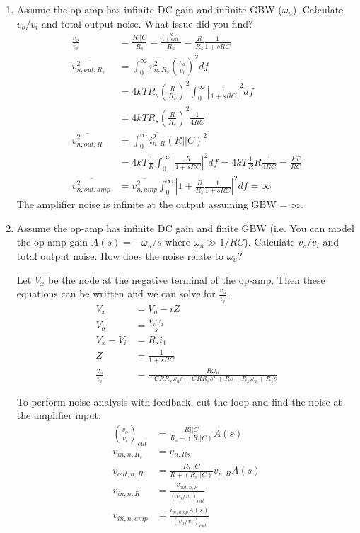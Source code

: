 \begin{enumerate}[label=(\alph*)]
  \item {\color{blue}Assume the op-amp has infinite DC gain and infinite GBW ($\omega_u$). Calculate $v_o / v_i$ and total output noise. What issue did you find?}
    \begin{align*}
      \frac{v_o}{v_i} &= \frac{R || C}{R_s} = \frac{\frac{R}{1 + sRC}}{R_s} = \frac{R}{R_s} \frac{1}{1 + sRC} \\
      \overline{v_{n,out,R_s}^2} &= \int_{0}^{\infty} \overline{v_{n,R_s}^2} \left(\frac{v_o}{v_i}\right)^2 df \\
        &= 4kT R_s \left(\frac{R}{R_s}\right)^2 \int_0^{\infty} \left|\frac{1}{1 + sRC}\right|^2 df \\
        &= 4kT R_s \left(\frac{R}{R_s}\right)^2 \frac{1}{4RC} \\
      \overline{v_{n,out,R}^2} &= \int_{0}^{\infty} \overline{i_{n,R}^2} (R || C)^2 \\
        &= 4kT \frac{1}{R} \int_{0}^{\infty} \left|\frac{R}{1 + sRC}\right|^2 df = 4kT \frac{1}{R} R \frac{1}{4RC} = \frac{kT}{RC} \\
      \overline{v_{n,out,amp}^2} &= \overline{v_{n,amp}^2} \int_0^{\infty} \left|1 + \frac{R}{R_s} \frac{1}{1 + sRC}\right|^2 df = \infty
    \end{align*}
    The amplifier noise is infinite at the output assuming GBW = $\infty$.

  \item {\color{blue}Assume the op-amp has infinite DC gain and finite GBW (i.e. You can model the op-amp gain $A(s) = -\omega_u/s$ where $\omega_u \gg 1 / RC$). Calculate $v_o/v_i$ and total output noise. How does the noise relate to $\omega_u$?}

    Let $V_{x}$ be the node at the negative terminal of the op-amp. Then these equations can be written and we can solve for $\frac{v_o}{v_i}$.
    \begin{align*}
      V_x &= V_o - i Z \\
      V_o &= \frac{V_x \omega_u}{s} \\
      V_x - V_i &= R_s i_1 \\
      Z &= \frac{1}{1 + sRC} \\
      \frac{v_o}{v_i} &= \frac{R \omega_u}{- C R R_{s} \omega_u s + C R R_{s} s^{2} + R s - R_{s} \omega_u + R_{s} s}
    \end{align*}

    To perform noise analysis with feedback, cut the loop and find the noise at the amplifier input:
    \begin{align*}
      \left(\frac{v_o}{v_i}\right)_{cut} &= \frac{R || C}{R_s + (R || C)} A(s) \\
      v_{in,n,R_s} &= v_{n,Rs} \\
      v_{out,n,R} &= \frac{R_s || C}{R + (R_s || C)} v_{n,R} A(s) \\
      v_{in,n,R} &= \frac{v_{out,n,R}}{(v_o / v_i)_{cut}} \\
      v_{in,n,amp} &= \frac{v_{n,amp} A(s)}{(v_o / v_i)_{cut}}
    \end{align*}
\end{enumerate}


